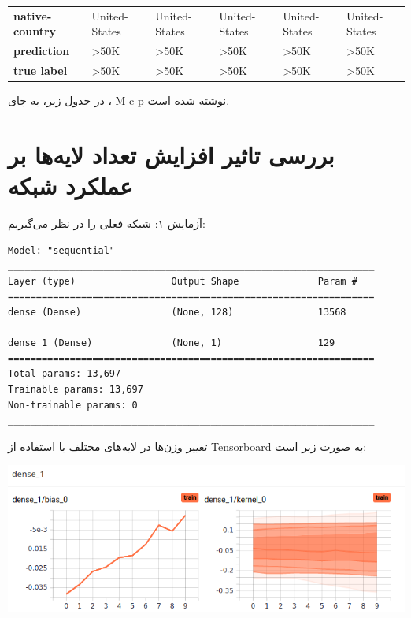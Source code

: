 \documentclass{article}
\begin{document}
\begin{latin}
\begin{table}[!hbp]
\begin{tabular}{@{}llllll@{}}
\textbf{native-country} & United-States     & United-States     & United-States     & United-States     & United-States     \\
\textbf{prediction}     & \textgreater{}50K & \textgreater{}50K & \textgreater{}50K & \textgreater{}50K & \textgreater{}50K \\
\textbf{true label}     & \textgreater{}50K & \textgreater{}50K & \textgreater{}50K & \textgreater{}50K & \textgreater{}50K \\ \bottomrule
\end{tabular}
\end{table}
\end{latin}


در جدول زیر، به جای  ، M-c-p نوشته شده است.




\section{
بررسی تاثیر افزایش تعداد لایه‌ها بر عملکرد شبکه
}

آزمایش ۱: 
شبکه فعلی را در نظر می‌گیریم:

\begin{latin}
\begin{lstlisting}
Model: "sequential"
_________________________________________________________________
Layer (type)                 Output Shape              Param #   
=================================================================
dense (Dense)                (None, 128)               13568     
_________________________________________________________________
dense_1 (Dense)              (None, 1)                 129       
=================================================================
Total params: 13,697
Trainable params: 13,697
Non-trainable params: 0
_________________________________________________________________
\end{lstlisting}
\end{latin}

تغییر وزن‌ها در لایه‌های مختلف با استفاده از Tensorboard به صورت زیر است:

\begin{center}
	\includegraphics[scale=0.60]{model_a_dense_1.png} 
\end{center}    
\end{document}
